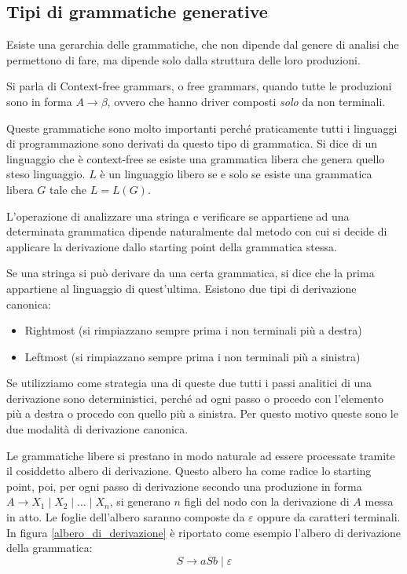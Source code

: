 \documentclass[class=book, crop=false, oneside, 12pt]{standalone}
\begin{document}
\subsection{Tipi di grammatiche generative}
Esiste una gerarchia delle grammatiche, che non dipende dal genere di analisi che permettono di fare, ma dipende solo dalla struttura delle loro produzioni.

Si parla di Context-free grammars, o free grammars, quando tutte le produzioni sono in forma $A \to \beta$, ovvero che hanno driver composti \emph{solo} da non terminali.

Queste grammatiche sono molto importanti perché praticamente tutti i linguaggi di programmazione sono derivati da questo tipo di grammatica.
Si dice di un linguaggio che è context-free se esiste una grammatica libera che genera quello steso linguaggio.
$L$ è un linguaggio libero se e solo se esiste una grammatica libera $G$ tale che $L=L(G)$.

L’operazione di analizzare una stringa e verificare se appartiene ad una determinata grammatica dipende naturalmente dal metodo con cui si decide di applicare la derivazione dallo starting point della grammatica stessa.

Se una stringa si può derivare da una certa grammatica, si dice che la prima appartiene al linguaggio di quest'ultima.
Esistono due tipi di derivazione canonica:
\begin{itemize}
    \item Rightmost (si rimpiazzano sempre prima i non terminali più a destra)
    \item Leftmost (si rimpiazzano sempre prima i non terminali più a sinistra)
\end{itemize}
Se utilizziamo come strategia una di queste due tutti i passi analitici di una derivazione sono deterministici, perché ad ogni passo o procedo con l’elemento più a destra o procedo con quello più a sinistra. Per questo motivo queste sono le due modalità di derivazione canonica.

Le grammatiche libere si prestano in modo naturale ad essere processate tramite il cosiddetto albero di derivazione.
Questo albero ha come radice lo starting point, poi, per ogni passo di derivazione secondo una produzione in forma $A \to X_1 \mid X_2 \mid\dots\mid X_n $, si generano $n$ figli del nodo con la derivazione di $A$ messa in atto.
Le foglie dell’albero saranno composte da $\varepsilon$ oppure da caratteri terminali. In figura \ref{albero_di_derivazione} è riportato come esempio l'albero di derivazione della grammatica:
\begin{equation}
    S \to aSb \mid \varepsilon
    \label{grammatica_allbero}
\end{equation}
\end{document}

